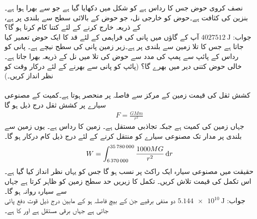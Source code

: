 نصف کروی حوض جس کا رداس  ہے کو شکل  میں دکھایا گیا ہے جو  سے بھرا ہوا ہے۔ بنزین کی کثافت  ہے۔حوض کو خارجی نل، جو حوض کے بالائی سطح سے  بلندی پر ہے، کے ذریعہ خارج کرنے کے لئے کتنا کام کرنا ہو گا؟\\
جواب:\quad
$\SI{4027512}{\joule}$
آپ کے گاؤں میں پانی کی فراہمی کے لئے   قد کا ایک حوض تعمیر کیا جاتا ہے جس کا تلا زمین سے  بلندی پر ہے۔زیر زمین پانی کی سطح  نیچے ہے۔ پانی کو  رداس کے پائپ سے  پمپ کی مدد سے  حوض کی تلا میں نل کے ذریعہ بھرا جاتا ہے۔ خالی حوض کتنی دیر میں بھرے گا؟ (پائپ کو پانی سے بھرنے کے لئے درکار وقت کو نظر انداز کریں۔) 
\\
\\
کشش ثقل کی قیمت زمین کے مرکز سے فاصلہ  پر منحصر ہوتا ہے۔کمیت  کے مصنوعی سیارے پر کشش ثقل درج ذیل ہو گا
\begin{align*}
F=\frac{GMm}{r^2}
\end{align*} 
جہاں زمین کی کمیت  ہے جبکہ تجاذبی مستقل  ہے۔ زمین کا رداس  ہے۔ یوں زمین سے  بلندی پر مدار تک  مصنوعی سیارے کو منتقل کرنے کے لئے درج ذیل  کام درکار ہو گا۔
\begin{align*}
W=\int_{\num{6370000}}^{\num{35780000}}\frac{1000MG}{r^2}\dif r
\end{align*}
حقیقت میں مصنوعی سیارہ ایک راکٹ پر نسب ہو گا جس کو یہاں نظر انداز کیا گیا ہے۔ اس تکمل کی قیمت تلاش کریں۔ تکمل کا زیریں حد سطح زمین کو ظاہر کرتا ہے جہاں سے سیارہ روانہ ہو گا۔\\
جواب:\quad
$\SI{5.144e10}{\joule}$
دو منفی برقیے  جن کے بیچ فاصلہ  ہو کے مابین درج ذیل قوت دفع پائی جاتی ہے جہاں  برقی مستقل ہے اور   کا  ہے۔
